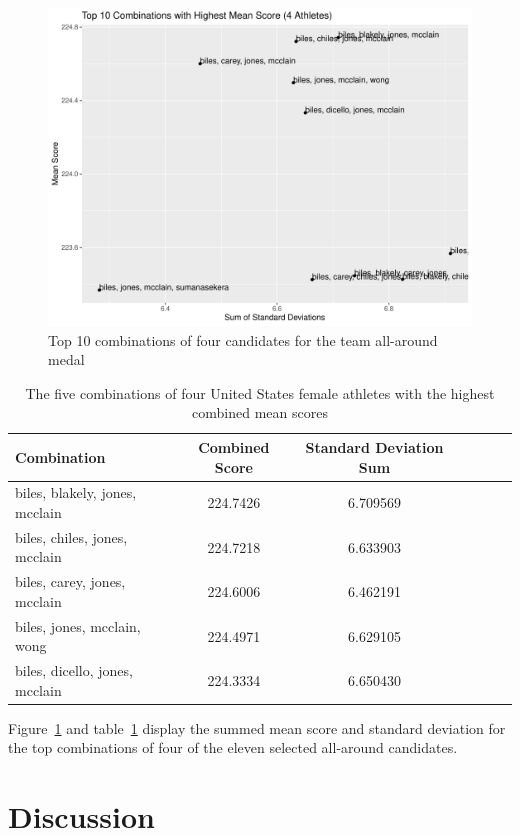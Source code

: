 \documentclass[12pt]{article}
\begin{document}
\begin{figure}[tbp]
  \centering
  \includegraphics[scale=0.6]{TeamCombinations4.pdf}
  \caption{Top 10 combinations of four candidates for the team all-around medal}
  \label{fig:AA4}
\end{figure}

\begin{table}[tbp]
  \caption{The five combinations of four United States female athletes with the highest combined mean scores}
  \label{tab:tableAA4}
\centering
\begin{tabular}[t]{lccllll}
 \toprule
Combination & Combined Score & Standard Deviation Sum\\
\midrule
biles, blakely, jones, mcclain & 224.7426 & 6.709569\\
\midrule
biles, chiles, jones, mcclain & 224.7218 & 6.633903\\
\midrule
biles, carey, jones, mcclain & 224.6006 & 6.462191\\
\midrule
biles, jones, mcclain, wong & 224.4971 & 6.629105\\
\midrule
biles, dicello, jones, mcclain & 224.3334 & 6.650430\\
\bottomrule
\end{tabular}
\end{table} 

Figure~\ref{fig:AA4} and table~\ref{tab:tableAA4} display the summed mean score and standard deviation 
for the top combinations of four of the eleven selected all-around candidates.

\section{Discussion}
\label{sec:dis}
\end{document}
